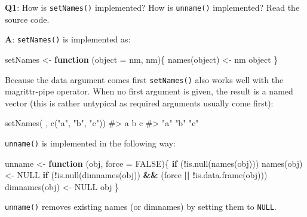 \documentclass[
]{krantz}
\makeatletter
\newenvironment{Shaded}{\begin{snugshade}}{\end{snugshade}}
\newcommand{\CommentTok}[1]{\textcolor[rgb]{0.56,0.35,0.01}{\textit{#1}}}
\newcommand{\ControlFlowTok}[1]{\textcolor[rgb]{0.13,0.29,0.53}{\textbf{#1}}}
\newcommand{\DataTypeTok}[1]{\textcolor[rgb]{0.13,0.29,0.53}{#1}}
\newcommand{\KeywordTok}[1]{\textcolor[rgb]{0.13,0.29,0.53}{\textbf{#1}}}
\newcommand{\NormalTok}[1]{#1}
\newcommand{\OperatorTok}[1]{\textcolor[rgb]{0.81,0.36,0.00}{\textbf{#1}}}
\newcommand{\OtherTok}[1]{\textcolor[rgb]{0.56,0.35,0.01}{#1}}
\newcommand{\StringTok}[1]{\textcolor[rgb]{0.31,0.60,0.02}{#1}}
\newenvironment{kframe}{%
\medskip{}
\setlength{\fboxsep}{.8em}
 \def\at@end@of@kframe{}%
 \ifinner\ifhmode%
  \def\at@end@of@kframe{\end{minipage}}%
  \begin{minipage}{\columnwidth}%
 \fi\fi%
 \def\FrameCommand##1{\hskip\@totalleftmargin \hskip-\fboxsep
 \colorbox{shadecolor}{##1}\hskip-\fboxsep
     \hskip-\linewidth \hskip-\@totalleftmargin \hskip\columnwidth}%
 \MakeFramed {\advance\hsize-\width
   \@totalleftmargin\z@ \linewidth\hsize
   \@setminipage}}%
 {\par\unskip\endMakeFramed%
 \at@end@of@kframe}
\renewenvironment{Shaded}{\begin{kframe}}{\end{kframe}}
\renewcommand{\KeywordTok} [1]{\textcolor[rgb]{0.00,0.44,0.13}{{#1}}}
\renewcommand{\DataTypeTok}[1]{\textcolor[rgb]{0.56,0.13,0.00}{{#1}}}
\renewcommand{\StringTok}  [1]{\textcolor[rgb]{0.25,0.44,0.63}{{#1}}}
\renewcommand{\CommentTok} [1]{\textcolor[rgb]{0.38,0.63,0.69}{{#1}}}
\renewcommand{\OtherTok}   [1]{\textcolor[rgb]{0.00,0.44,0.13}{{#1}}}
\renewcommand{\NormalTok}  [1]{{#1}}
\makeatother
\begin{document}
\textbf{{Q1}}: How is \texttt{setNames()} implemented? How is \texttt{unname()} implemented? Read the source code.

\textbf{{A}}: \texttt{setNames()} is implemented as:

\begin{Shaded}
\begin{Highlighting}[]
\NormalTok{setNames <-}\StringTok{ }\ControlFlowTok{function}\NormalTok{ (}\DataTypeTok{object =}\NormalTok{ nm, nm)\{}
  \KeywordTok{names}\NormalTok{(object) <-}\StringTok{ }\NormalTok{nm}
\NormalTok{  object}
\NormalTok{\}}
\end{Highlighting}
\end{Shaded}

Because the data argument comes first \texttt{setNames()} also works well with the magrittr-pipe operator. When no first argument is given, the result is a named vector (this is rather untypical as required arguments usually come first):

\begin{Shaded}
\begin{Highlighting}[]
\KeywordTok{setNames}\NormalTok{( , }\KeywordTok{c}\NormalTok{(}\StringTok{"a"}\NormalTok{, }\StringTok{"b"}\NormalTok{, }\StringTok{"c"}\NormalTok{))}
\CommentTok{#>   a   b   c }
\CommentTok{#> "a" "b" "c"}
\end{Highlighting}
\end{Shaded}

\texttt{unname()} is implemented in the following way:

\begin{Shaded}
\begin{Highlighting}[]
\NormalTok{unname <-}\StringTok{ }\ControlFlowTok{function}\NormalTok{ (obj, }\DataTypeTok{force =} \OtherTok{FALSE}\NormalTok{)\{}
  \ControlFlowTok{if}\NormalTok{ (}\OperatorTok{!}\KeywordTok{is.null}\NormalTok{(}\KeywordTok{names}\NormalTok{(obj))) }
    \KeywordTok{names}\NormalTok{(obj) <-}\StringTok{ }\OtherTok{NULL}
  \ControlFlowTok{if}\NormalTok{ (}\OperatorTok{!}\KeywordTok{is.null}\NormalTok{(}\KeywordTok{dimnames}\NormalTok{(obj)) }\OperatorTok{&&}\StringTok{ }\NormalTok{(force }\OperatorTok{||}\StringTok{ }\OperatorTok{!}\KeywordTok{is.data.frame}\NormalTok{(obj))) }
    \KeywordTok{dimnames}\NormalTok{(obj) <-}\StringTok{ }\OtherTok{NULL}
\NormalTok{  obj}
\NormalTok{\}}
\end{Highlighting}
\end{Shaded}

\texttt{unname()} removes existing names (or dimnames) by setting them to \texttt{NULL}.
\end{document}
